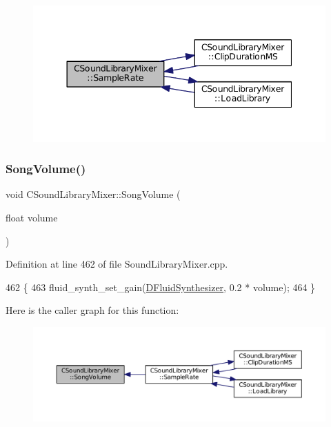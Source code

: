 \begin{figure}[H]
\begin{center}
\leavevmode
\includegraphics[width=344pt]{classCSoundLibraryMixer_a03221f151dfe72381da5d0d0539bab94_icgraph}
\end{center}
\end{figure}
\hypertarget{classCSoundLibraryMixer_ad38d70e5783e3b67fdf022877549ccf8}{}\label{classCSoundLibraryMixer_ad38d70e5783e3b67fdf022877549ccf8} 
\subsubsection{\texorpdfstring{Song\+Volume()}{SongVolume()}}
{\footnotesize\ttfamily void C\+Sound\+Library\+Mixer\+::\+Song\+Volume (\begin{DoxyParamCaption}\item[{float}]{volume }\end{DoxyParamCaption})}



Definition at line 462 of file Sound\+Library\+Mixer.\+cpp.


\begin{DoxyCode}
462                                                \{
463     fluid\_synth\_set\_gain(\hyperlink{classCSoundLibraryMixer_a6c1663c381dbf2aa18c82a23141f409c}{DFluidSynthesizer}, 0.2 * volume);
464 \}
\end{DoxyCode}
Here is the caller graph for this function\+:\nopagebreak
\begin{figure}[H]
\begin{center}
\leavevmode
\includegraphics[width=350pt]{classCSoundLibraryMixer_ad38d70e5783e3b67fdf022877549ccf8_icgraph}
\end{center}
\end{figure}
\hypertarget{classCSoundLibraryMixer_a13fdebfbc5fdee60067c38a3c60dd2a9}{}\label{classCSoundLibraryMixer_a13fdebfbc5fdee60067c38a3c60dd2a9} 
